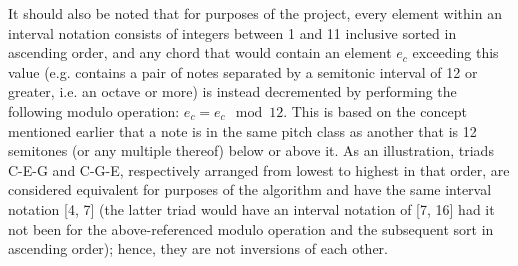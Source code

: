 \documentclass[twoside]{article}
\begin{document}
	It should also be noted that for purposes of the project, every element within an interval notation consists of integers between 1 and 11 inclusive sorted in ascending order, and any chord that would contain an element $e_c$ exceeding this value (e.g. contains a pair of notes separated by a semitonic interval of 12 or greater, i.e. an octave or more) is instead decremented by performing the following modulo operation: $e_c = e_c \mod 12$. This is based on the concept mentioned earlier that a note is in the same pitch class as another that is 12 semitones (or any multiple thereof) below or above it. As an illustration, triads C-E-G and C-G-E, respectively arranged from lowest to highest in that order, are considered equivalent for purposes of the algorithm and have the same interval notation [4, 7] (the latter triad would have an interval notation of [7, 16] had it not been for the above-referenced modulo operation and the subsequent sort in ascending order); hence, they are not inversions of each other.
	
\end{document}
